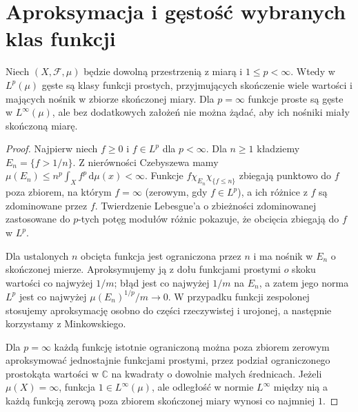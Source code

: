 \section{Aproksymacja i gęstość wybranych klas funkcji}

\begin{twierdzenie}
\label{thm:simple-dense-lp-14}
Niech $(X,\mathcal F,\mu)$ będzie dowolną przestrzenią
z miarą i $1\le p<\infty$. Wtedy w $L^p(\mu)$ gęste są
klasy funkcji prostych, przyjmujących skończenie wiele
wartości i mających nośnik w zbiorze skończonej miary.
Dla $p=\infty$ funkcje proste są gęste w $L^\infty(\mu)$,
ale bez dodatkowych założeń nie można żądać, aby
ich nośniki miały skończoną miarę.
\end{twierdzenie}
\begin{proof}
Najpierw niech $f\ge0$ i $f\in L^p$ dla $p<\infty$.
Dla $n\ge1$ kładziemy $E_n=\{f>1/n\}$.
Z nierówności Czebyszewa mamy
$\mu(E_n)\le n^p\int_Xf^p\,\mathrm d\mu(x)<\infty$.
Funkcje $f\chi_{E_n}\chi_{\{f\le n\}}$
zbiegają punktowo do $f$ poza zbiorem, na którym
$f=\infty$ (zerowym, gdy $f\in L^p$), a ich
różnice z $f$ są zdominowane przez $f$.
Twierdzenie Lebesgue'a o zbieżności zdominowanej
zastosowane do $p$-tych potęg modułów różnic pokazuje,
że obcięcia zbiegają do $f$ w $L^p$.

Dla ustalonych $n$ obcięta funkcja jest ograniczona
przez $n$ i ma nośnik w $E_n$ o skończonej mierze.
Aproksymujemy ją z dołu funkcjami prostymi
$o$ skoku wartości co najwyżej $1/m$; błąd
jest co najwyżej $1/m$ na $E_n$, a zatem jego
norma $L^p$ jest co najwyżej
$\mu(E_n)^{1/p}/m\to0$. W przypadku funkcji
zespolonej stosujemy aproksymację osobno do
części rzeczywistej i urojonej, a następnie
korzystamy z Minkowskiego.

Dla $p=\infty$ każdą funkcję istotnie ograniczoną
można poza zbiorem zerowym aproksymować
jednostajnie funkcjami prostymi, przez podział
ograniczonego prostokąta wartości w $\mathbb C$
na kwadraty o dowolnie małych średnicach.
Jeżeli $\mu(X)=\infty$, funkcja $1\in L^\infty(\mu)$,
ale odległość w normie $L^\infty$ między nią
a każdą funkcją zerową poza zbiorem skończonej
miary wynosi co najmniej $1$.
\end{proof}

